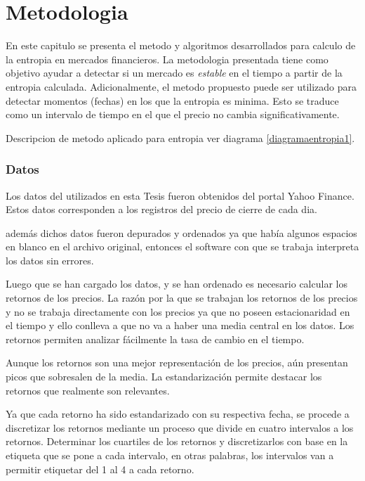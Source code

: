%
\chapter{Metodologia}
\label{Metodologia}

En este capitulo se presenta el metodo y algoritmos desarrollados para calculo de la entropia en mercados financieros.
La metodologia presentada tiene como objetivo ayudar a detectar si un mercado es \textit{estable} en el tiempo a partir de la entropia calculada.
Adicionalmente, el metodo propuesto puede ser utilizado para detectar momentos (fechas) en los que la entropia es minima. 
Esto se traduce como un intervalo de tiempo en el que el precio no cambia significativamente.


Descripcion de metodo aplicado para entropia  ver diagrama \ref{diagramaentropia1}.

\subsection{Datos}
Los datos del utilizados en esta Tesis fueron obtenidos del portal Yahoo Finance.
Estos datos corresponden a los registros del precio de cierre de cada dia.

 además dichos datos fueron depurados y ordenados ya que había algunos espacios en blanco en el archivo original, entonces el software con que se trabaja interpreta los datos sin errores. 

Luego que se han cargado los datos, y se han ordenado es necesario calcular los retornos de los precios. La razón por la que se trabajan los retornos de los precios y no se trabaja directamente con los precios ya que no poseen estacionaridad en el tiempo y ello conlleva a que no va a haber una media central en los datos. Los retornos permiten analizar fácilmente la tasa de cambio en el tiempo. 

Aunque los retornos son una mejor representación de los precios, aún presentan picos que sobresalen de la media. La estandarización permite destacar los retornos que realmente son relevantes. 

Ya que cada retorno ha sido estandarizado con su respectiva fecha,  se procede a discretizar los retornos mediante un proceso que divide en cuatro intervalos a los retornos. Determinar los cuartiles de los retornos y discretizarlos con base en la etiqueta que se pone a cada intervalo, en otras palabras, los intervalos van a permitir etiquetar del 1 al 4 a cada retorno. 

